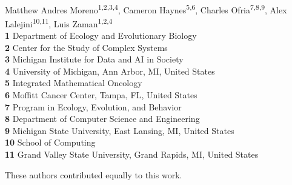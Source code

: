 \begin{flushleft}
{\Large
\textbf{} %
}
{\large
\textit{} %
}
\newline
\\
Matthew Andres Moreno\textsuperscript{1,2,3,4\Yinyang*},
Cameron Haynes\textsuperscript{5,6\Yinyang},
Charles Ofria\textsuperscript{7,8,9},
Alex Lalejini\textsuperscript{10,11\ddag},
Luis Zaman\textsuperscript{1,2,4\ddag}
\\
\bigskip
\textbf{1} Department of Ecology and Evolutionary Biology\\
\textbf{2} Center for the Study of Complex Systems\\
\textbf{3} Michigan Institute for Data and AI in Society\\
\textbf{4} University of Michigan, Ann Arbor, MI, United States\\
\textbf{5} Integrated Mathematical Oncology\\
\textbf{6} Moffitt Cancer Center, Tampa, FL, United States\\
\textbf{7} Program in Ecology, Evolution, and Behavior\\
\textbf{8} Department of Computer Science and Engineering\\
\textbf{9} Michigan State University, East Lansing, MI, United States\\
\textbf{10} School of Computing\\
\textbf{11} Grand Valley State University, Grand Rapids, MI, United States\\
\bigskip

%
%
\Yinyang These authors contributed equally to this work.


\end{flushleft}
